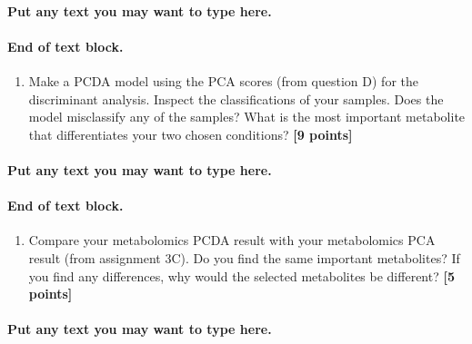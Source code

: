 \documentclass[
]{article}
\providecommand{\tightlist}{%
  \setlength{\itemsep}{0pt}\setlength{\parskip}{0pt}}
\begin{document}
\hypertarget{put-any-text-you-may-want-to-type-here.-29}{%
\paragraph{Put any text you may want to type
here.}\label{put-any-text-you-may-want-to-type-here.-29}}

\hypertarget{end-of-text-block.-31}{%
\paragraph{End of text block.}\label{end-of-text-block.-31}}

\begin{enumerate}
\def\labelenumi{\Alph{enumi})}
\setcounter{enumi}{4}
\tightlist
\item
  Make a PCDA model using the PCA scores (from question D) for the
  discriminant analysis. Inspect the classifications of your samples.
  Does the model misclassify any of the samples? What is the most
  important metabolite that differentiates your two chosen conditions?
  \textbf{{[}9 points{]}}
\end{enumerate}

\hypertarget{put-any-text-you-may-want-to-type-here.-30}{%
\paragraph{Put any text you may want to type
here.}\label{put-any-text-you-may-want-to-type-here.-30}}

\hypertarget{end-of-text-block.-32}{%
\paragraph{End of text block.}\label{end-of-text-block.-32}}

\begin{enumerate}
\def\labelenumi{\Alph{enumi})}
\setcounter{enumi}{5}
\tightlist
\item
  Compare your metabolomics PCDA result with your metabolomics PCA
  result (from assignment 3C). Do you find the same important
  metabolites? If you find any differences, why would the selected
  metabolites be different? \textbf{{[}5 points{]}}
\end{enumerate}

\hypertarget{put-any-text-you-may-want-to-type-here.-31}{%
\paragraph{Put any text you may want to type
here.}\label{put-any-text-you-may-want-to-type-here.-31}}
\end{document}
